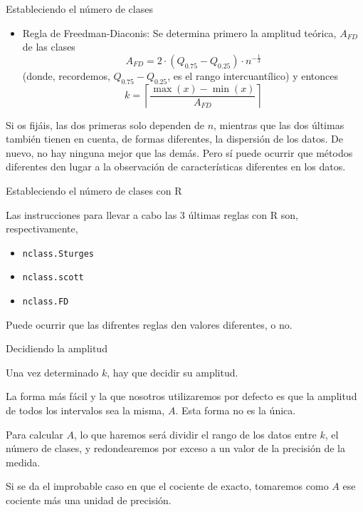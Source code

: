 \documentclass[
  ignorenonframetext,
]{beamer}
\providecommand{\tightlist}{%
  \setlength{\itemsep}{0pt}\setlength{\parskip}{0pt}}
\begin{document}
\begin{frame}{Estableciendo el número de clases}
\protect\hypertarget{estableciendo-el-nuxfamero-de-clases-2}{}

\begin{itemize}
\tightlist
\item
  Regla de Freedman-Diaconis: Se determina primero la amplitud teórica,
  \(A_{FD}\) de las clases
  \[A_{FD} = 2\cdot(Q_{0.75}-Q_{0.25})\cdot n^{-\frac{1}{3}}\] (donde,
  recordemos, \(Q_{0.75}-Q_{0.25}\), es el rango intercuantílico) y
  entonces
  \[k = \left\lceil \frac{\max(x)-\min(x)}{A_{FD}}\right\rceil\]
\end{itemize}

Si os fijáis, las dos primeras solo dependen de \(n\), mientras que las
dos últimas también tienen en cuenta, de formas diferentes, la
dispersión de los datos. De nuevo, no hay ninguna mejor que las demás.
Pero sí puede ocurrir que métodos diferentes den lugar a la observación
de características diferentes en los datos.

\end{frame}

\begin{frame}[fragile]{Estableciendo el número de clases con R}
\protect\hypertarget{estableciendo-el-nuxfamero-de-clases-con-r}{}

Las instrucciones para llevar a cabo las 3 últimas reglas con R son,
respectivamente,

\begin{itemize}
\tightlist
\item
  \texttt{nclass.Sturges}
\item
  \texttt{nclass.scott}
\item
  \texttt{nclass.FD}
\end{itemize}

Puede ocurrir que las difrentes reglas den valores diferentes, o no.

\end{frame}

\begin{frame}{Decidiendo la amplitud}
\protect\hypertarget{decidiendo-la-amplitud}{}

Una vez determinado \(k\), hay que decidir su amplitud.

La forma más fácil y la que nosotros utilizaremos por defecto es que la
amplitud de todos los intervalos sea la misma, \(A\). Esta forma no es
la única.

Para calcular \(A\), lo que haremos será dividir el rango de los datos
entre \(k\), el número de clases, y redondearemos por exceso a un valor
de la precisión de la medida.

Si se da el improbable caso en que el cociente de exacto, tomaremos como
\(A\) ese cociente más una unidad de precisión.

\end{frame}
\end{document}
